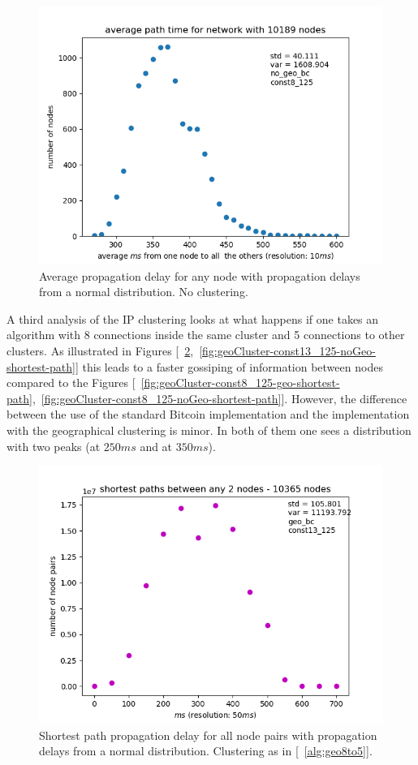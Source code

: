 \documentclass[a4paper, oneside]{discothesis}
\begin{document}
\begin{figure}
    \centering
    \includegraphics[width=.8\columnwidth]{figures/geoCluster/const8_125/noGeo/average-hops-for-network-with-10189-nodes.png}
    \caption{Average propagation delay for any node with propagation delays from a normal distribution. No clustering.}
    \label{fig:geoCluster-const8_125-noGeo-average-hops}
\end{figure}

A third analysis of the IP clustering looks at what happens if one takes an algorithm with 8 connections inside the same cluster and 5 connections to other clusters. As illustrated in Figures [~\ref{fig:geoCluster-const13_125-geo-shortest-path},~\ref{fig:geoCluster-const13_125-noGeo-shortest-path}] this leads to a faster gossiping of information between nodes compared to the Figures [~\ref{fig:geoCluster-const8_125-geo-shortest-path},~\ref{fig:geoCluster-const8_125-noGeo-shortest-path}]. However, the difference between the use of the standard Bitcoin implementation and the implementation with the geographical clustering is minor. In both of them one sees a distribution with two peaks (at $250ms$ and at $350ms$).

\begin{figure}
    \centering
    \includegraphics[width=.8\columnwidth]{figures/geoCluster/const13_125/geo/final-shortest-paths-between-any-nodes-10365-nodes.png}
    \caption{Shortest path propagation delay for all node pairs with propagation delays from a normal distribution. Clustering as in [~\ref{alg:geo8to5}].}
    \label{fig:geoCluster-const13_125-geo-shortest-path}
\end{figure}
\end{document}
